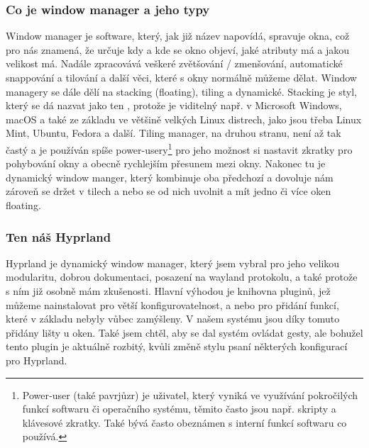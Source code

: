 \documentclass[12pt,a4paper]{article}
\begin{document}
\subsubsection{Co je window manager a jeho typy}
Window manager je software, který, jak již název napovídá, spravuje okna, což pro nás znamená, že určuje kdy a kde se okno objeví, jaké atributy 
má a jakou velikost má. Nadále zpracovává veškeré zvětšování / zmenšování, automatické snappování a tilování a další
věci, které s okny normálně můžeme dělat. Window managery se dále dělí na stacking (floating), tiling a dynamické.
\autocite{WhatTilingWindow}
Stacking je styl, který se dá nazvat jako ten , protože je viditelný např. v Microsoft Windows, macOS a 
také ze základu ve většině velkých Linux distrech, jako jsou třeba Linux Mint, Ubuntu, Fedora a další. Tiling manager, na druhou
stranu, není až tak častý a je používán spíše power-usery\footnote{Power‑user (také pavrjůzr) je uživatel, který vyniká ve využívání pokročilých
funkcí softwaru či operačního systému, těmito často jsou např. skripty a klávesové zkratky. Také bývá často obeznámen
s interní funkcí softwaru co používá.} pro jeho možnost si nastavit zkratky pro pohybování okny a obecně
rychlejším přesunem mezi okny. Nakonec tu je dynamický window manger, který kombinuje oba předchozí a dovoluje nám zároveň
se držet v tilech a nebo se od nich uvolnit a mít jedno či více oken floating.

\subsubsection{Ten náš Hyprland}
Hyprland \autocite{HyprlandWiki2026} je dynamický window manager, který jsem vybral pro jeho velikou modularitu, dobrou dokumentaci, posazení na
wayland protokolu, a také protože s ním již osobně mám zkušenosti. Hlavní výhodou je knihovna pluginů, jež můžeme 
nainstalovat pro větší konfigurovatelnost, a nebo pro přidání funkcí, které v základu nebyly vůbec zamýšleny. V našem
systému jsou díky tomuto přidány lišty u oken. Také jsem chtěl, aby se dal systém ovládat gesty, ale bohužel tento plugin
je aktuálně rozbitý, kvůli změně stylu psaní některých konfigurací pro Hyprland.
\end{document}
